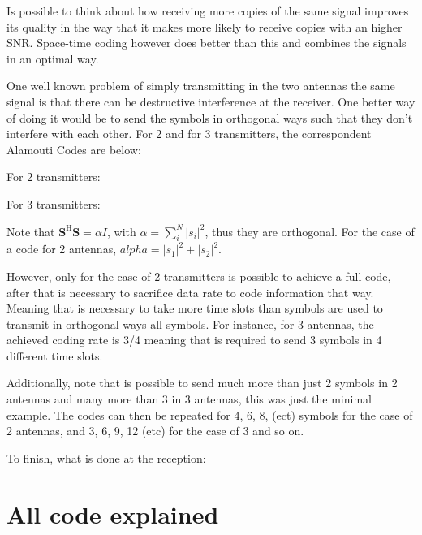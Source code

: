 \documentclass[12pt, a4paper]{article}
\begin{document}
\par Is possible to think about how receiving more copies of the same signal improves its quality in the way that it makes more likely to receive copies with an higher SNR. Space-time coding however does better than this and combines the signals in an optimal way.

\par One well known problem of simply transmitting in the two antennas the same signal is that there can be destructive interference at the receiver. One better way of doing it would be to send the symbols in orthogonal ways such that they don't interfere with each other. For 2 and for 3 transmitters, the correspondent Alamouti Codes are below:

For 2 transmitters:

For 3 transmitters:



\par Note that $\mathbf{S}^\text{H}\mathbf{S} = \alpha I$, with $\alpha = \sum_i^N |s_i|^2$, thus they are orthogonal. For the case of a code for 2 antennas, $alpha = |s_1|^2 + |s_2|^2$.

\par However, only for the case of 2 transmitters is possible to achieve a full code, after that is necessary to sacrifice data rate to code information that way. Meaning that is necessary to take more time slots than symbols are used to transmit in orthogonal ways all symbols. For instance, for 3 antennas, the achieved coding rate is 3/4 meaning that is required to send 3 symbols in 4 different time slots.
\par Additionally, note that is possible to send much more than just 2 symbols in 2 antennas and many more than 3 in 3 antennas, this was just the minimal example. The codes can then be repeated for 4, 6, 8, (ect) symbols for the case of 2 antennas, and 3, 6, 9, 12 (etc) for the case of 3 and so on.

\par To finish, what is done at the reception:





\section{All code explained}
\end{document}
